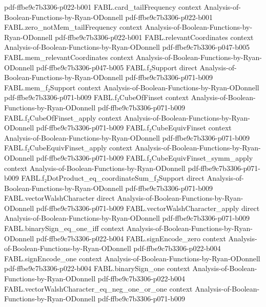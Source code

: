 \begin{theorem}
  {pdf-ffbe9c7b3306-p022-b001}
\proofstep
  {FABL.card_tailFrequency}
  {context}
  {Analysis-of-Boolean-Functions-by-Ryan-ODonnell}
  {pdf-ffbe9c7b3306-p022-b001}
\proofstep
  {FABL.zero_notMem_tailFrequency}
  {context}
  {Analysis-of-Boolean-Functions-by-Ryan-ODonnell}
  {pdf-ffbe9c7b3306-p022-b001}
\proofstep
  {FABL.relevantCoordinates}
  {context}
  {Analysis-of-Boolean-Functions-by-Ryan-ODonnell}
  {pdf-ffbe9c7b3306-p047-b005}
\proofstep
  {FABL.mem_relevantCoordinates}
  {context}
  {Analysis-of-Boolean-Functions-by-Ryan-ODonnell}
  {pdf-ffbe9c7b3306-p047-b005}
\proofstep
  {FABL.f₂Support}
  {direct}
  {Analysis-of-Boolean-Functions-by-Ryan-ODonnell}
  {pdf-ffbe9c7b3306-p071-b009}
\proofstep
  {FABL.mem_f₂Support}
  {context}
  {Analysis-of-Boolean-Functions-by-Ryan-ODonnell}
  {pdf-ffbe9c7b3306-p071-b009}
\proofstep
  {FABL.f₂CubeOfFinset}
  {context}
  {Analysis-of-Boolean-Functions-by-Ryan-ODonnell}
  {pdf-ffbe9c7b3306-p071-b009}
\proofstep
  {FABL.f₂CubeOfFinset_apply}
  {context}
  {Analysis-of-Boolean-Functions-by-Ryan-ODonnell}
  {pdf-ffbe9c7b3306-p071-b009}
\proofstep
  {FABL.f₂CubeEquivFinset}
  {context}
  {Analysis-of-Boolean-Functions-by-Ryan-ODonnell}
  {pdf-ffbe9c7b3306-p071-b009}
\proofstep
  {FABL.f₂CubeEquivFinset_apply}
  {context}
  {Analysis-of-Boolean-Functions-by-Ryan-ODonnell}
  {pdf-ffbe9c7b3306-p071-b009}
\proofstep
  {FABL.f₂CubeEquivFinset_symm_apply}
  {context}
  {Analysis-of-Boolean-Functions-by-Ryan-ODonnell}
  {pdf-ffbe9c7b3306-p071-b009}
\proofstep
  {FABL.f₂DotProduct_eq_coordinateSum_f₂Support}
  {direct}
  {Analysis-of-Boolean-Functions-by-Ryan-ODonnell}
  {pdf-ffbe9c7b3306-p071-b009}
\proofstep
  {FABL.vectorWalshCharacter}
  {direct}
  {Analysis-of-Boolean-Functions-by-Ryan-ODonnell}
  {pdf-ffbe9c7b3306-p071-b009}
\proofstep
  {FABL.vectorWalshCharacter_apply}
  {direct}
  {Analysis-of-Boolean-Functions-by-Ryan-ODonnell}
  {pdf-ffbe9c7b3306-p071-b009}
\proofstep
  {FABL.binarySign_eq_one_iff}
  {context}
  {Analysis-of-Boolean-Functions-by-Ryan-ODonnell}
  {pdf-ffbe9c7b3306-p022-b004}
\proofstep
  {FABL.signEncode_zero}
  {context}
  {Analysis-of-Boolean-Functions-by-Ryan-ODonnell}
  {pdf-ffbe9c7b3306-p022-b004}
\proofstep
  {FABL.signEncode_one}
  {context}
  {Analysis-of-Boolean-Functions-by-Ryan-ODonnell}
  {pdf-ffbe9c7b3306-p022-b004}
\proofstep
  {FABL.binarySign_one}
  {context}
  {Analysis-of-Boolean-Functions-by-Ryan-ODonnell}
  {pdf-ffbe9c7b3306-p022-b004}
\proofstep
  {FABL.vectorWalshCharacter_eq_neg_one_or_one}
  {context}
  {Analysis-of-Boolean-Functions-by-Ryan-ODonnell}
  {pdf-ffbe9c7b3306-p071-b009}

\end{theorem}
